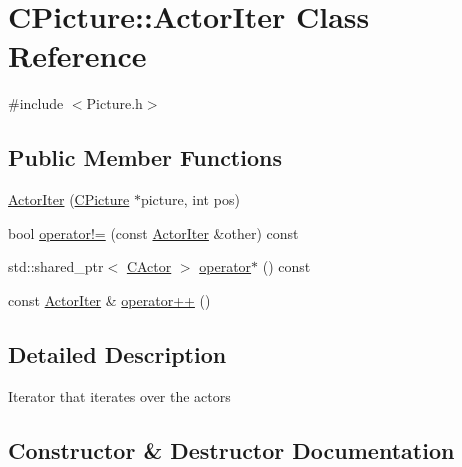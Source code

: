 \hypertarget{class_c_picture_1_1_actor_iter}{}\section{C\+Picture\+:\+:Actor\+Iter Class Reference}
\label{class_c_picture_1_1_actor_iter}


{\ttfamily \#include $<$Picture.\+h$>$}

\subsection*{Public Member Functions}
\begin{DoxyCompactItemize}
\item 
\hyperlink{class_c_picture_1_1_actor_iter_a2f2f57be59c8599af1e2c304272d2deb}{Actor\+Iter} (\hyperlink{class_c_picture}{C\+Picture} $\ast$picture, int pos)
\item 
bool \hyperlink{class_c_picture_1_1_actor_iter_a68cc04a07bd5766b1d7b0ca0c0bcb856}{operator!=} (const \hyperlink{class_c_picture_1_1_actor_iter}{Actor\+Iter} \&other) const 
\item 
std\+::shared\+\_\+ptr$<$ \hyperlink{class_c_actor}{C\+Actor} $>$ \hyperlink{class_c_picture_1_1_actor_iter_a7401edfaeb0f0fb2ff54df57d84a3777}{operator$\ast$} () const 
\item 
const \hyperlink{class_c_picture_1_1_actor_iter}{Actor\+Iter} \& \hyperlink{class_c_picture_1_1_actor_iter_a8e52080b2ce8a1f12e2dfcef310b2164}{operator++} ()
\end{DoxyCompactItemize}


\subsection{Detailed Description}
Iterator that iterates over the actors 

\subsection{Constructor \& Destructor Documentation}
\hypertarget{class_c_picture_1_1_actor_iter_a2f2f57be59c8599af1e2c304272d2deb}{}
